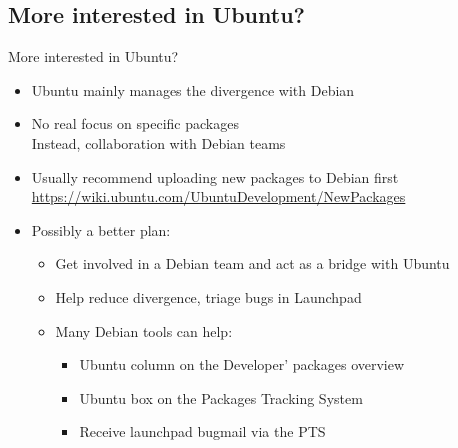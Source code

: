 \documentclass[10pt,final]{beamer}
\begin{document}
\subsection{More interested in Ubuntu?}
\begin{frame}{More interested in Ubuntu?}
  \begin{itemize}
  \item Ubuntu mainly manages the divergence with Debian
    \br
  \item No real focus on specific packages\\
    Instead, collaboration with Debian teams
    \br
  \item Usually recommend uploading new packages to Debian first\\
    \url{https://wiki.ubuntu.com/UbuntuDevelopment/NewPackages}
    \br
  \item Possibly a better plan:
    \begin{itemize}
    \item Get involved in a Debian team and act as a bridge with Ubuntu
      \hbr
    \item Help reduce divergence, triage bugs in Launchpad
      \hbr
    \item Many Debian tools can help:
      \begin{itemize}
      \item Ubuntu column on the Developer' packages overview
      \item Ubuntu box on the Packages Tracking System
      \item Receive launchpad bugmail via the PTS
      \end{itemize}
    \end{itemize}
  \end{itemize}
\end{frame}
\end{document}
